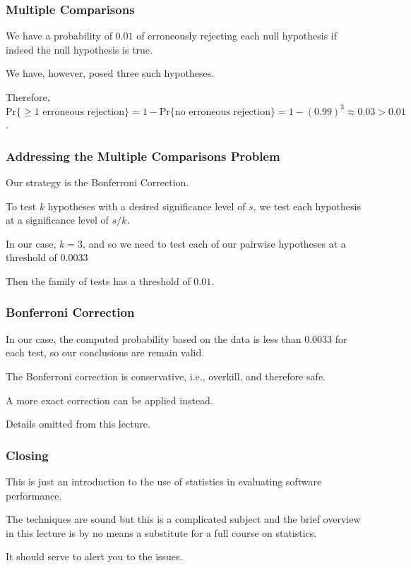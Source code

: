 \begin{frame}
\frametitle{Multiple Comparisons}
\begin{changemargin}{1cm}

We have a probability of
$0.01$ of erroneously rejecting each null hypothesis if indeed
the null hypothesis is true. 

We have, however, posed three
such hypotheses.

Therefore,
$\text{Pr}\{\ge 1 \text{ erroneous rejection}\} =
1 - \text{Pr}\{\text{no erroneous rejection}\} =
1 - (0.99)^3 \approx 0.03 > 0.01$. 

\end{changemargin}
\end{frame}

\begin{frame}
\frametitle{Addressing the Multiple Comparisons Problem}
\begin{changemargin}{1cm}
Our strategy is the Bonferroni Correction.

To test
$k$ hypotheses with a desired significance level of
$s$, we test each hypothesis at a significance level
of $s/k$. 

In our case, $k=3$, and so we need to test
each of our pairwise hypotheses at a threshold of
$0.0033$ 

Then the family of tests has a threshold
of $0.01$.


\end{changemargin}
\end{frame}


\begin{frame}
\frametitle{Bonferroni Correction}
\begin{changemargin}{1cm}

In our case, the computed probability
based on the data is less than $0.0033$ for each test,
so our conclusions are remain valid.

The Bonferroni correction is conservative, i.e.,
overkill, and therefore safe. 

A more exact
correction can be applied instead.

Details omitted from this lecture.

\end{changemargin}
\end{frame}


\begin{frame}
\frametitle{Closing}
\begin{changemargin}{1cm}

This is just an introduction to the use of statistics in evaluating
software performance.

The techniques are sound but this is a complicated
subject and the brief overview in this lecture is by no means a substitute
for a full course on statistics.

It should serve to alert you to the issues.

\end{changemargin}
\end{frame}




